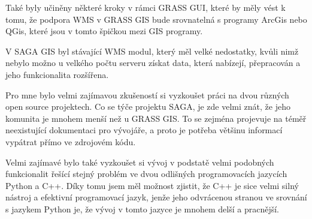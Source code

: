 \documentclass[a4paper,12pt]{article}
\begin{document}
Také byly učiněny některé kroky v rámci GRASS GUI, které by měly vést k tomu, že podpora WMS v GRASS GIS bude srovnatelná s programy ArcGis nebo QGis, které jsou v tomto špičkou mezi GIS programy. 

V SAGA GIS byl stávající WMS modul, který měl velké nedostatky, kvůli nimž nebylo možno u velkého počtu serveru získat data, která nabízejí, přepracován a jeho funkcionalita rozšířena. 

Pro mne bylo velmi zajímavou zkušeností si vyzkoušet práci na dvou různých open source projektech. Co se týče projektu SAGA, je zde velmi znát, že jeho komunita je mnohem menší než u GRASS GIS. To se zejména projevuje na téměř neexistující dokumentaci pro vývojáře, a proto je potřeba většinu informací vypátrat přímo ve zdrojovém kódu.   

Velmi zajímavé bylo také vyzkoušet si vývoj v podstatě velmi podobných funkcionalit řešící stejný problém ve dvou odlišných programovacích jazycích Python a C++. 
Díky tomu jsem měl možnost zjistit, že C++ je sice velmi silný nástroj a efektivní programovací jazyk, jenže jeho odvrácenou stranou ve srovnání s jazykem Python je, že vývoj v tomto jazyce je mnohem delší a pracnější.
\end{document}
